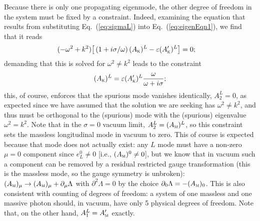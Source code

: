 \documentclass[amsmath,amssymb,aps,10pt,prd,letterpaper,nofootinbib,balancelastpage,notitlepage,superscriptaddress,twocolumn,floatfix]{revtex4-2}
\renewcommand{\eqref}[2][]{Eq{#1}.~(\ref{eq:#2})}	%
\newcommand{\lb}{\ensuremath{\left}}					%
\newcommand{\rb}{\ensuremath{\right}}					%
\newcommand{\tsc}[1]{\textsc{#1}}
\newcommand{\kin}[1]{({#1}_{\textsc{k}})}
\newcommand{\primekin}[1]{({#1}_{\textsc{k}}^\prime)}
\newcommand{\mass}[1]{({#1}_{\textsc{m}})}
\begin{document}
Because there is only one propagating eigenmode, the other degree of freedom in the system must be fixed by a constraint. 
Indeed, examining the equation that results from substituting \eqref{sigmaL} into \eqref{eigenEqn1}, we find that it reads
\begin{align}
    (-\omega^2 + k^2)\big[ \lb( 1+ i \sigma/\omega\rb) \kin{A}^L - \varepsilon \primekin{A}^L \big] &= 0;
\end{align}
demanding that this is solved for $\omega^2 \neq k^2$ leads to the constraint
\begin{align}
    \kin{A}^L = \varepsilon \primekin{A}^L \frac{\omega}{ \omega + i \sigma };
    \label{eq:constraint}
\end{align}
this, of course, enforces that the spurious mode vanishes identically, $A_{2}^{L} = 0$, as expected since we have assumed that the solution we are seeking has $\omega^2 \neq k^2$, and thus must be orthogonal to the (spurious) mode with the (spurious)  eigenvalue $\omega^2=k^2$.
Note that in the $\sigma = 0$ vacuum limit, $A_{2}^{L} = \mass{A}^L$, so this constraint sets the massless longitudinal mode in vacuum to zero.
This of course is expected because that mode does not actually exist: any $L$ mode must have a non-zero $\mu=0$ component since $e_L^0 \neq 0$ [i.e., $\mass{A}^0 \neq 0$], but we know that in vacuum such a component can be removed by a residual restricted gauge transformation (this is the massless mode, so the gauge symmetry is unbroken): $\mass{A}_\mu \rightarrow \mass{A}_\mu + \partial_\mu \Lambda$ with $\partial^2 \Lambda = 0$ by the choice $\partial_0 \Lambda = - \mass{A}_0$.
This is also consistent with counting of degrees of freedom: a system of one massless and one massive photon should, in vacuum, have only 5 physical degrees of freedom.
Note that, on the other hand, $A_{1}^L = A_{\tsc{m}}'$ exactly.
\end{document}
